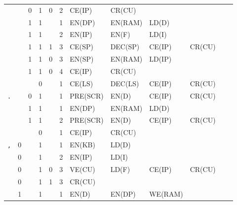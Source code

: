 \begin{landscape}
\begin{longtable}[c] {c|cccc|c|llllll}
    \rowcolor{Gray}              &   & 0 & 1     & 0    & 2     & CE(IP)  & CR(CU) &         &        &        &        \\
    \rowcolor{White}             &   & 1 & 1     &      & 1     & EN(DP)  & EN(RAM) & LD(D)  &        &        &        \\
    \rowcolor{White}             &   & 1 & 1     &      & 2     & EN(IP)  & EN(F)   & LD(I)  &        &        &        \\
    \rowcolor{White}             &   & 1 & 1     & 1    & 3     & CE(SP)  & DEC(SP) & CE(IP) & CR(CU) &        &        \\
    \rowcolor{Gray}              &   & 1 & 1     & 0    & 3     & EN(SP)  & EN(RAM) & LD(IP) &        &        &        \\
    \rowcolor{Gray}              &   & 1 & 1     & 0    & 4     & CE(IP)  & CR(CU)  &        &        &        &        \\
    \rowcolor{White}             &   &   & 0     &      & 1     & CE(LS)  & DEC(LS) & CE(IP) & CR(CU) &        &        \\ \hline
    \rowcolor{Gray}  \texttt{.}  &   & 0 & 1     &      & 1     & PRE(SCR)& EN(D)   & CE(IP) & CR(CU) &        &        \\
    \rowcolor{White}             &   & 1 & 1     &      & 1     & EN(DP)  & EN(RAM) & LD(D)  &        &        &        \\
    \rowcolor{White}             &   & 1 & 1     &      & 2     & PRE(SCR)& EN(D)   & CE(IP) & CR(CU) &        &        \\
    \rowcolor{Gray}              &   &   & 0     &      & 1     & CE(IP) & CR(CU)  &         &        &        &        \\ \hline
    \rowcolor{White} \texttt{,}  & 0 &   & 1     &      & 1     & EN(KB)  & LD(D)   &        &        &        &        \\
    \rowcolor{White}             & 0 &   & 1     &      & 2     & EN(IP)  & LD(I)   &        &        &        &        \\
    \rowcolor{White}             & 0 &   & 1     & 0    & 3     & VE(CU)  & LD(F)   & CE(IP) & CR(CU) &        &        \\
    \rowcolor{Gray}              & 0 &   & 1     & 1    & 3     & CR(CU)  &         &        &        &        &        \\   
    \rowcolor{White}             & 1 &   & 1     &      & 1     & EN(D)   & EN(DP)  & WE(RAM)&        &        &        \\       

\end{longtable}
\end{landscape}
